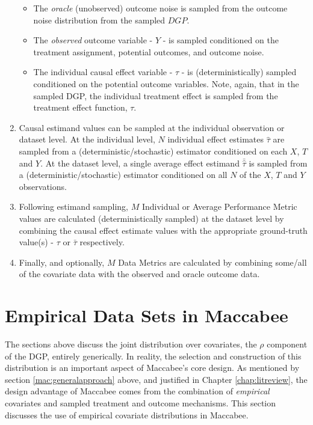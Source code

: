 \documentclass[../main.tex]{subfiles}
\begin{document}
\begin{enumerate}
\begin{itemize}
   \item The \textit{oracle} (unobserved) outcome noise is sampled from the outcome noise distribution from the sampled $DGP$.

   \item The \textit{observed} outcome variable - $Y$ - is sampled conditioned on the treatment assignment, potential outcomes, and outcome noise.

   \item The individual causal effect variable - $\tau$ - is (deterministically) sampled conditioned on the potential outcome variables. Note, again, that in the sampled DGP, the individual treatment effect is sampled from the treatment effect function, $\tau$.

\end{itemize}

\item Causal estimand values can be sampled at the individual observation or dataset level. At the individual level, $N$ individual effect estimates $\hat{\tau}$ are sampled from a (deterministic/stochastic) estimator conditioned on each $X$, $T$ and $Y$. At the dataset level, a single average effect estimand $\bar{\hat{\tau}}$ is sampled from a (deterministic/stochastic) estimator conditioned on all $N$ of the $X$, $T$ and $Y$ observations.

\item Following estimand sampling, $M$ Individual or Average Performance Metric values are calculated (deterministically sampled) at the dataset level by combining the causal effect estimate values with the appropriate ground-truth value(s) - $\tau$ or $\bar{\tau}$ respectively.

\item Finally, and optionally, $M$ Data Metrics are calculated by combining some/all of the covariate data with the observed and oracle outcome data.

\end{enumerate}

\section{Empirical Data Sets in Maccabee}
\label{mac:data}

The sections above discuss the joint distribution over covariates, the $\rho$ component of the DGP, entirely generically. In reality, the selection and construction of this distribution is an important aspect of Maccabee's core design. As mentioned by section \ref{mac:generalapproach} above, and justified in Chapter \ref{chap:litreview}, the design advantage of Maccabee comes from the combination of \textit{empirical} covariates and sampled treatment and outcome mechanisms. This section discusses the use of empirical covariate distributions in Maccabee.
\end{document}
